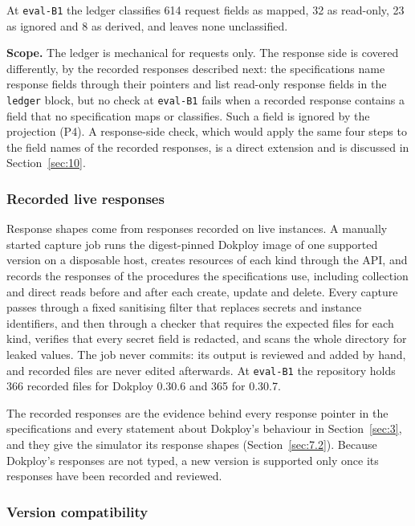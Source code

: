 At \texttt{eval-B1} the ledger classifies 614 request fields as mapped, 32 as read-only, 23 as ignored and 8
as derived, and leaves none unclassified.

\textbf{Scope.} The ledger is mechanical for requests only. The response side is covered differently,
by the recorded responses described next: the specifications name response fields through their pointers and list read-only
response fields in the \texttt{ledger} block, but no check at \texttt{eval-B1} fails when a recorded response
contains a field that no specification maps or classifies. Such a field is ignored by the projection
(P4). A response-side check, which would apply the same four steps to the field names of the recorded
responses, is a direct extension and is discussed in Section~\ref{sec:10}.

\subsubsection*{Recorded live responses}

Response shapes come from responses recorded on live instances. A manually started capture job runs
the digest-pinned Dokploy image of one supported version on a disposable host, creates resources of
each kind through the API, and records the responses of the procedures the specifications use,
including collection and direct reads before and after each create, update and delete. Every capture
passes through a fixed sanitising filter that replaces secrets and instance identifiers, and then
through a checker that requires the expected files for each kind, verifies that every secret field is
redacted, and scans the whole directory for leaked values. The job never commits: its output is
reviewed and added by hand, and recorded files are never edited afterwards. At \texttt{eval-B1} the
repository holds 366 recorded files for Dokploy 0.30.6 and 365 for 0.30.7.

The recorded responses are the evidence behind every response pointer in the specifications and
every statement about Dokploy's behaviour in Section~\ref{sec:3}, and they give the simulator its response
shapes (Section~\ref{sec:7.2}). Because Dokploy's responses are not typed, a new version is supported only once
its responses have been recorded and reviewed.

\subsubsection*{Version compatibility}

